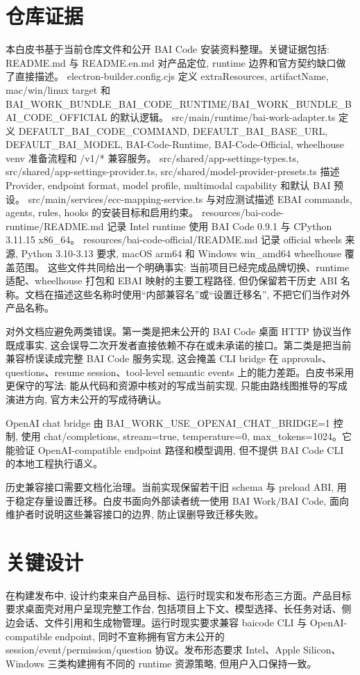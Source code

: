 \section{仓库证据}
本白皮书基于当前仓库文件和公开 BAI Code 安装资料整理。关键证据包括: README.md 与 README.en.md 对产品定位, runtime 边界和官方契约缺口做了直接描述。 electron-builder.config.cjs 定义 extraResources, artifactName, mac/win/linux target 和 BAI\_WORK\_BUNDLE\_BAI\_CODE\_RUNTIME/BAI\_WORK\_BUNDLE\_BAI\_CODE\_OFFICIAL 的默认逻辑。 src/main/runtime/bai-work-adapter.ts 定义 DEFAULT\_BAI\_CODE\_COMMAND, DEFAULT\_BAI\_BASE\_URL, DEFAULT\_BAI\_MODEL, BAI-Code-Runtime, BAI-Code-Official, wheelhouse venv 准备流程和 /v1/* 兼容服务。 src/shared/app-settings-types.ts, src/shared/app-settings-provider.ts, src/shared/model-provider-presets.ts 描述 Provider, endpoint format, model profile, multimodal capability 和默认 BAI 预设。 src/main/services/ecc-mapping-service.ts 与对应测试描述 EBAI commands, agents, rules, hooks 的安装目标和启用约束。 resources/bai-code-runtime/README.md 记录 Intel runtime 使用 BAI Code 0.9.1 与 CPython 3.11.15 x86\_64。 resources/bai-code-official/README.md 记录 official wheels 来源, Python 3.10-3.13 要求, macOS arm64 和 Windows win\_amd64 wheelhouse 覆盖范围。 这些文件共同给出一个明确事实: 当前项目已经完成品牌切换、runtime 适配、wheelhouse 打包和 EBAI 映射的主要工程路径, 但仍保留若干历史 ABI 名称。文档在描述这些名称时使用“内部兼容名”或“设置迁移名”, 不把它们当作对外产品名称。

对外文档应避免两类错误。第一类是把未公开的 BAI Code 桌面 HTTP 协议当作既成事实, 这会误导二次开发者直接依赖不存在或未承诺的接口。第二类是把当前兼容桥误读成完整 BAI Code 服务实现, 这会掩盖 CLI bridge 在 approvals、questions、resume session、tool-level semantic events 上的能力差距。白皮书采用更保守的写法: 能从代码和资源中核对的写成当前实现, 只能由路线图推导的写成演进方向, 官方未公开的写成待确认。

OpenAI chat bridge 由 BAI\_WORK\_USE\_OPENAI\_CHAT\_BRIDGE=1 控制, 使用 chat/completions, stream=true, temperature=0, max\_tokens=1024。它能验证 OpenAI-compatible endpoint 路径和模型调用, 但不提供 BAI Code CLI 的本地工程执行语义。

历史兼容接口需要文档化治理。当前实现保留若干旧 schema 与 preload ABI, 用于稳定存量设置迁移。白皮书面向外部读者统一使用 BAI Work/BAI Code, 面向维护者时说明这些兼容接口的边界, 防止误删导致迁移失败。

\section{关键设计}
在构建发布中, 设计约束来自产品目标、运行时现实和发布形态三方面。产品目标要求桌面壳对用户呈现完整工作台, 包括项目上下文、模型选择、长任务对话、侧边会话、文件引用和生成物管理。运行时现实要求兼容 baicode CLI 与 OpenAI-compatible endpoint, 同时不宣称拥有官方未公开的 session/event/permission/question 协议。发布形态要求 Intel、Apple Silicon、Windows 三类构建拥有不同的 runtime 资源策略, 但用户入口保持一致。

